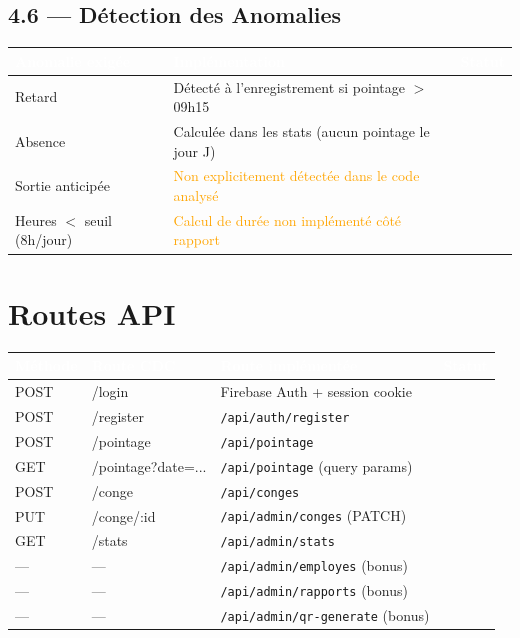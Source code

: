 \documentclass[12pt,a4paper]{article}
\newcommand{\cmark}{\textcolor{vert}{\ding{51}}}
\newcommand{\pmark}{\textcolor{orange}{\ding{115}}}
\begin{document}
\subsection{4.6 — Détection des Anomalies}

\begin{longtable}{p{5.5cm} p{5.5cm} c}
\toprule
\rowcolor{headerblue}
\textcolor{white}{\textbf{Anomalie exigée}} & \textcolor{white}{\textbf{Implémentation}} & \textcolor{white}{\textbf{Statut}} \\
\midrule
\endhead
Retard & Détecté à l'enregistrement si pointage $>$ 09h15 & \cmark \\
\midrule
Absence & Calculée dans les stats (aucun pointage le jour J) & \cmark \\
\midrule
Sortie anticipée & \textcolor{orange}{Non explicitement détectée dans le code analysé} & \pmark \\
\midrule
Heures $<$ seuil (8h/jour) & \textcolor{orange}{Calcul de durée non implémenté côté rapport} & \pmark \\
\bottomrule
\end{longtable}

\section{Routes API}

\begin{longtable}{p{2.5cm} p{4.5cm} p{4.5cm} c}
\toprule
\rowcolor{headerblue}
\textcolor{white}{\textbf{Méthode}} & \textcolor{white}{\textbf{Route CDC}} & \textcolor{white}{\textbf{Route implémentée}} & \textcolor{white}{\textbf{Statut}} \\
\midrule
\endhead
POST & /login & Firebase Auth + session cookie & \cmark \\
\midrule
POST & /register & \texttt{/api/auth/register} & \cmark \\
\midrule
POST & /pointage & \texttt{/api/pointage} & \cmark \\
\midrule
GET & /pointage?date=... & \texttt{/api/pointage} (query params) & \cmark \\
\midrule
POST & /conge & \texttt{/api/conges} & \cmark \\
\midrule
PUT & /conge/:id & \texttt{/api/admin/conges} (PATCH) & \cmark \\
\midrule
GET & /stats & \texttt{/api/admin/stats} & \cmark \\
\midrule
— & — & \texttt{/api/admin/employes} (bonus) & \cmark \\
\midrule
— & — & \texttt{/api/admin/rapports} (bonus) & \cmark \\
\midrule
— & — & \texttt{/api/admin/qr-generate} (bonus) & \cmark \\
\bottomrule
\end{longtable}
\end{document}
